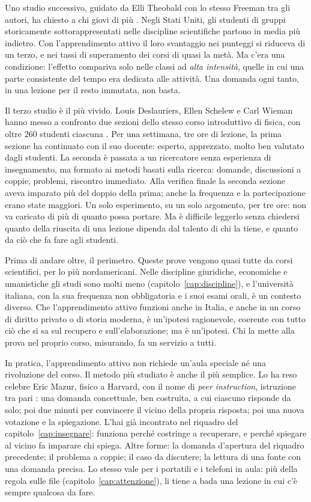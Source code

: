 Uno studio successivo, guidato da Elli Theobald con lo stesso Freeman
tra gli autori, ha chiesto a chi giovi di più \parencite{theobald2020}.
Negli Stati Uniti, gli studenti di gruppi storicamente sottorappresentati
nelle discipline scientifiche partono in media più indietro. Con
l'apprendimento attivo il loro svantaggio nei punteggi si riduceva di
un terzo, e nei tassi di superamento dei corsi di quasi la metà. Ma
c'era una condizione: l'effetto compariva solo nelle classi ad
\emph{alta intensità}, quelle in cui una parte consistente del tempo
era dedicata alle attività. Una domanda ogni tanto, in una lezione per
il resto immutata, non basta.

Il terzo studio è il più vivido. Louis Deslauriers, Ellen Schelew e
Carl Wieman hanno messo a confronto due sezioni dello stesso corso
introduttivo di fisica, con oltre 260 studenti ciascuna
\parencite{deslauriers2011}. Per una settimana, tre ore di lezione, la
prima sezione ha continuato con il suo docente: esperto, apprezzato,
molto ben valutato dagli studenti. La seconda è passata a un
ricercatore senza esperienza di insegnamento, ma formato ai metodi
basati sulla ricerca: domande, discussioni a coppie, problemi, riscontro
immediato. Alla verifica finale la seconda sezione aveva imparato più
del doppio della prima; anche la frequenza e la partecipazione erano
state maggiori. Un solo esperimento, su un solo argomento, per tre
ore: non va caricato di più di quanto possa portare. Ma è difficile leggerlo senza chiedersi quanto della riuscita di
una lezione dipenda dal talento di chi la tiene, e quanto da ciò che
fa fare agli studenti.

Prima di andare oltre, il perimetro. Queste prove vengono quasi tutte
da corsi scientifici, per lo più nordamericani. Nelle discipline
giuridiche, economiche e umanistiche gli studi sono molti meno
(capitolo~\ref{cap:discipline}), e l'università italiana, con la sua
frequenza non obbligatoria e i suoi esami orali, è un contesto
diverso. Che l'apprendimento attivo funzioni anche in Italia, e anche in
un corso di diritto privato o di storia moderna, è un'ipotesi
ragionevole, coerente con tutto ciò che si sa sul recupero e
sull'elaborazione; ma è un'ipotesi. Chi la mette alla prova nel
proprio corso, misurando, fa un servizio a tutti.

In pratica, l'apprendimento attivo non richiede un'aula speciale né
una rivoluzione del corso. Il metodo più studiato è anche il più
semplice. Lo ha reso celebre Eric Mazur, fisico a Harvard, con il nome
di \emph{peer instruction}, istruzione tra pari
\parencite{mazur1997}: una domanda concettuale, ben costruita, a cui
ciascuno risponde da solo; poi due minuti per convincere il vicino
della propria risposta; poi una nuova votazione e la spiegazione.
L'hai già incontrato nel riquadro del capitolo~\ref{cap:insegnare}:
funziona perché costringe a recuperare, e perché spiegare al vicino
fa imparare chi spiega. Altre forme: la domanda d'apertura del
riquadro precedente; il problema a coppie; il caso da discutere; la
lettura di una fonte con una domanda precisa. Lo stesso vale per i
portatili e i telefoni in aula: più della regola sulle file
(capitolo~\ref{cap:attenzione}), li tiene a bada una lezione in cui
c'è sempre qualcosa da fare.

